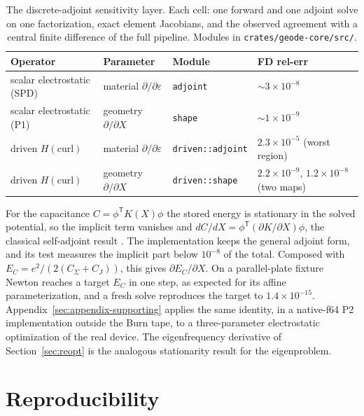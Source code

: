 \documentclass{anvil-paper}
\begin{document}
\begin{table}[tbp]
  \centering
  \caption{The discrete-adjoint sensitivity layer. Each cell: one forward
  and one adjoint solve on one factorization, exact element Jacobians, and
  the observed agreement with a central finite difference of the full
  pipeline. Modules in \texttt{crates/geode-core/src/}.}
  \label{tab:adjoint-matrix}
  \footnotesize
  \begin{tabular}{@{}llll@{}}
    \toprule
    Operator & Parameter & Module & FD rel-err \\
    \midrule
    scalar electrostatic (SPD) & material $\partial/\partial\varepsilon$ &
      \texttt{adjoint} & ${\sim}3\times10^{-8}$ \\
    scalar electrostatic (P1) & geometry $\partial/\partial X$ &
      \texttt{shape} & ${\sim}1\times10^{-9}$ \\
    driven $H(\mathrm{curl})$ & material $\partial/\partial\varepsilon$ &
      \texttt{driven::adjoint} & $2.3\times10^{-5}$ (worst region) \\
    driven $H(\mathrm{curl})$ & geometry $\partial/\partial X$ &
      \texttt{driven::shape} & $2.2\times10^{-9}$, $1.2\times10^{-8}$ (two maps) \\
    \bottomrule
  \end{tabular}
\end{table}

For the capacitance $C = \phi^{\mathsf T}K(X)\phi$ the stored energy is
stationary in the solved potential, so the implicit term vanishes and
$dC/dX = \phi^{\mathsf T}(\partial K/\partial X)\phi$, the classical
self-adjoint result \citep{park2019continuum}. The implementation keeps
the general adjoint form, and its test measures the implicit part below
$10^{-8}$ of the total. Composed with $E_C = e^2/(2(C_\Sigma + C_J))$,
this gives $\partial E_C/\partial X$. On a parallel-plate fixture Newton
reaches a target $E_C$ in one step, as expected for its affine
parameterization, and a fresh solve reproduces the target to
$1.4\times10^{-15}$. Appendix~\ref{sec:appendix-supporting} applies the
same identity, in a native-f64 P2 implementation outside the Burn tape,
to a three-parameter electrostatic optimization of the real device. The
eigenfrequency derivative of Section~\ref{sec:reopt} is the analogous
stationarity result for the eigenproblem.

\section{Reproducibility}
\label{sec:repro}
\end{document}
